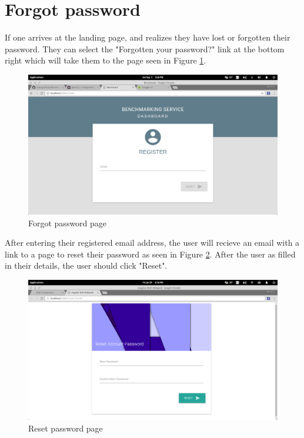 \documentclass[11pt,a4paper]{article}
\begin{document}
\section{Forgot password}
If one arrives at the landing page, and realizes they have lost or forgotten their password. They can select the
"Forgotten your password?" link at the bottom right which will take them to the page seen in Figure \ref{fig:forgotPage}.
\begin{figure}[H]
	\begin{center}
		\includegraphics[scale=0.3]{../Images/User Manual/Forgot Page.png}
		\caption{Forgot password page}
		\label{fig:forgotPage}
	\end{center}  
\end{figure}
After entering their registered email address, the user will recieve an email with a link to a page to reset their password
as seen in Figure \ref{fig:resetPage}. After the user as filled in their details, the user should click "Reset".
\begin{figure}[H]
	\begin{center}
		\includegraphics[scale=0.3]{../Images/User Manual/Reset Page.png}
		\caption{Reset password page}
		\label{fig:resetPage}
	\end{center}  
\end{figure}
\end{document}
